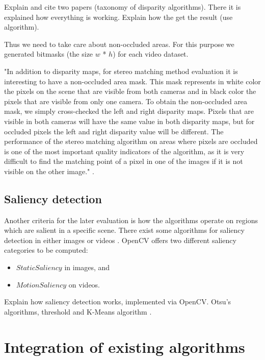 Explain and cite two papers (taxonomy of disparity algorithms).
There it is explained how everything is working.
Explain how the get the result (use algorithm).

Thus we need to take care about non-occluded areas. For this purpose we generated bitmasks (the size $w$ * $h$) for each video dataset.

"In addition to disparity maps, for stereo matching method evaluation it is interesting to have a non-occluded area mask. This mask represents in white color the pixels on the scene that are visible from both cameras and in black color the pixels that are visible from only one camera.
To obtain the non-occluded area mask, we simply cross-checked the left and right disparity maps. Pixels that are visible in both cameras will have the same value in both disparity maps, but for occluded pixels the left and right disparity value will be different.
The performance of the stereo matching algorithm on areas where pixels are occluded is one of the most important quality indicators of the algorithm, as it is very difficult to find the matching point of a pixel in one of the images if it is not visible on the other image." \citep{martull2012realistic}.

\subsection*{Saliency detection}

Another criteria for the later evaluation is how the algorithms operate on regions which are salient in a specific scene.
There exist some algorithms for saliency detection in either images or videos \citep{dittrich2013saliency, opencv_library}.
OpenCV offers two different saliency categories to be computed:
\begin{itemize}
  \item $StaticSaliency$ in images, and
  \item $MotionSaliency$ on videos.
\end{itemize}

\noindent Explain how saliency detection works, implemented via OpenCV. Otsu's algorithms, threshold and K-Means algorithm \citep{hou2007saliency}.

\section{Integration of existing algorithms}

